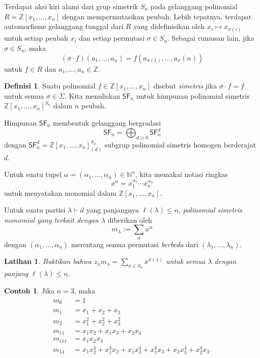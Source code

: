 \documentclass[12pt]{article}
\theoremstyle{plain}
\newtheorem{exercise}[theorem]{Latihan}
\theoremstyle{definition}
\newtheorem{definition}[theorem]{Definisi}
\newtheorem{example}[theorem]{Contoh}
\theoremstyle{remark}
\numberwithin{equation}{section}
\begin{document}
Terdapat aksi kiri alami dari grup simetrik $S_n$ pada gelanggang
polinomial $R=\mathbb{Z}[x_1,\ldots,x_n]$ dengan mempermutasikan peubah.
Lebih tepatnya, terdapat automorfisme gelanggang tunggal dari $R$ yang didefinisikan
oleh $x_i \mapsto x_{\sigma(i)}$ untuk setiap peubah $x_i$ dan setiap
permutasi $\sigma \in S_n$.
Sebagai rumusan lain, jika $\sigma \in S_n$, maka
\[
(\sigma \cdot f)(a_1,\ldots,a_n) =
f\left(a_{\sigma(1)}, \ldots, a_{\sigma}(n)\right)
\]
untuk $f \in R$ dan $a_1,\ldots,a_n \in \mathbb{Z}$.

\begin{definition}
Suatu polinomial $f \in \mathbb{Z}[x_1,\ldots, x_n]$ disebut \emph{simetris}
jika $\sigma \cdot f = f$ untuk semua $\sigma \in \Sigma$.
Kita menuliskan $\mathsf{SF}_n$ untuk himpunan polinomial simetris
$\mathbb{Z}[x_1,\ldots,x_n]^{S_n}$ dalam $n$ peubah.
\end{definition}

Himpunan $\mathsf{SF}_n$ membentuk gelanggang bergradasi
\[
\mathsf{SF}_n = \bigoplus_{d \ge 0} \mathsf{SF}_n^d
\]
dengan $\mathsf{SF}_n^d = \mathbb{Z}[x_1,\ldots,x_n]_{(d)}^{S_n}$
subgrup polinomial simetris homogen berderajat $d$.

Untuk suatu tupel $\alpha = (\alpha_1,\ldots,\alpha_n) \in \mathbb{N}^n$,
kita memakai notasi ringkas
\[
x^\alpha = x_1^{\alpha_1} \cdots x_n^{\alpha_n}
\]
untuk menyatakan monomial dalam $\mathbb{Z}[x_1,\ldots,x_n]$.

Untuk suatu partisi $\lambda \vdash d$ yang panjangnya $\ell(\lambda) \le n$,
\emph{polinomial simetris monomial yang terkait dengan $\lambda$}
diberikan oleh
\[
m_\lambda := \sum_{\alpha} x^\alpha
\]
dengan $(\alpha_1,\ldots,\alpha_n)$ merentang semua permutasi
\emph{berbeda} dari $(\lambda_1,\ldots,\lambda_n)$.

\begin{exercise}
Buktikan bahwa $\displaystyle z_\lambda m_\lambda = \sum_{\sigma \in S_n}
x^{\sigma(\lambda)}$ untuk semua $\lambda$ dengan panjang $\ell(\lambda) \le n$.
\end{exercise}

\begin{example}
Jika $n=3$, maka
\begin{align*}
m_\emptyset &= 1\\
m_1 &= x_1 + x_2 + x_3\\
m_2 &= x_1^2 + x_2^2 + x_3^2\\
m_{11} &= x_1x_2 + x_1x_3 + x_2x_3\\
m_{111} &= x_1x_2x_3 \\
m_{14} &= x_1x_2^4 + x_1^4x_2 + x_1x_3^4 + x_1^4x_3 + x_2x_3^4 +
x_2^4x_3.
\end{align*}
\end{example}
\end{document}
